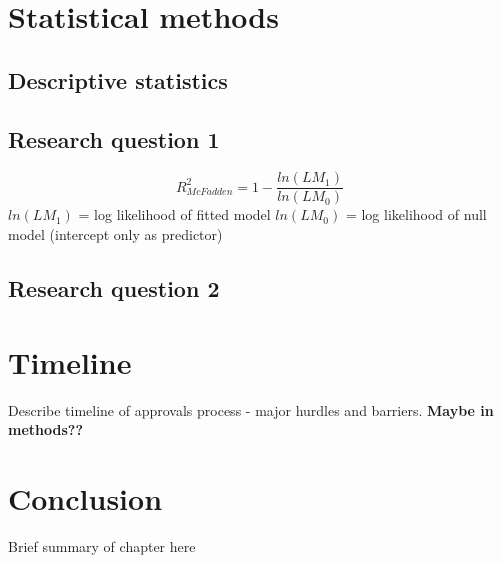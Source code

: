 \documentclass[]{article}
\begin{document}
\FloatBarrier

\section{Statistical methods}\label{sec:methods-stats}

\subsection{Descriptive statistics}\label{descr}

\subsection{Research question 1}\label{stats-rq1}

\[R^{2}_{McFadden} = 1 - \frac {ln(LM_{1})}{ln(LM_{0})} \]
\(ln(LM_{1})\) = log likelihood of fitted model \newline
\(ln(LM_{0})\) = log likelihood of null model (intercept only as
predictor)

\subsection{Research question 2}\label{stats-rq2}

\section{Timeline}\label{sec:timeline}

Describe timeline of approvals process - major hurdles and barriers.
\textbf{Maybe in methods??}

\section{Conclusion}\label{sec:data-conclusion}

Brief summary of chapter here
\end{document}
